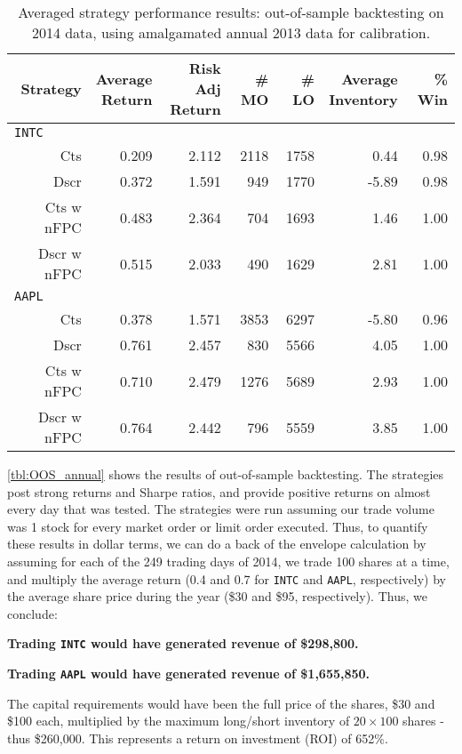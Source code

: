 \begin{table}
\centering
{}
\setlength{\tabcolsep}{9pt}
\begin{tabular}{@{} *{7}{r} @{}}
\toprule
Strategy & \cellbreak{t}{r}{Average \\ Return} & \cellbreak{t}{r}{Risk Adj \\ Return} & \cellbreak{t}{r}{\# MO \\ \hphantom{Risk Adj}} & \cellbreak{t}{r}{\# LO \\ \hphantom{Risk Adj}} & \cellbreak{t}{r}{Average \\ Inventory} & \cellbreak{t}{r}{\% Win \\ \hphantom{Risk Adj}} \\
\midrule
\multicolumn{7}{l}{\texttt{INTC}} \\ 
Cts & 0.209 & 2.112 & 2118 & 1758 & 0.44 & 0.98 \\
Dscr & 0.372 & 1.591 & 949 & 1770 & -5.89 & 0.98 \\
Cts w nFPC & 0.483 & 2.364 & 704 & 1693 & 1.46 & 1.00 \\
Dscr w nFPC & 0.515 & 2.033 & 490 & 1629 & 2.81 & 1.00 \\[2ex]
\multicolumn{7}{l}{\texttt{AAPL}} \\ 
Cts & 0.378 & 1.571 & 3853 & 6297 & -5.80 & 0.96 \\
Dscr & 0.761 & 2.457 & 830 & 5566 & 4.05 & 1.00 \\
Cts w nFPC & 0.710 & 2.479 & 1276 & 5689 & 2.93 & 1.00 \\
Dscr w nFPC & 0.764 & 2.442 & 796 & 5559 & 3.85 & 1.00 \\
\bottomrule
\end{tabular}
\caption[Out-of-sample backtesting performance using annual calibration]{Averaged strategy performance results: out-of-sample backtesting on 2014 data, using amalgamated annual 2013 data for calibration.}
\label{tbl:OOS_annual}
\end{table}

\autoref{tbl:OOS_annual} shows the results of out-of-sample backtesting. The strategies post strong returns and Sharpe ratios, and provide positive returns on almost every day that was tested. The strategies were run assuming our trade volume was 1 stock for every market order or limit order executed. Thus, to quantify these results in dollar terms, we can do a back of the envelope calculation by assuming for each of the 249 trading days of 2014, we trade 100 shares at a time, and multiply the average return (0.4 and 0.7 for \texttt{INTC} and \texttt{AAPL}, respectively) by the average share price during the year (\$30 and \$95, respectively). Thus, we conclude:

\begin{center}
{\bf Trading \texttt{INTC} would have generated revenue of \$298,800.} \par
{\bf Trading \texttt{AAPL} would have generated revenue of \$1,655,850.}
\end{center}

The capital requirements would have been the full price of the shares, \$30 and \$100 each, multiplied by the maximum long/short inventory of $20 \times 100$ shares - thus \$260,000. This represents a return on investment (ROI) of 652\%.